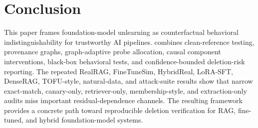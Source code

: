 \section{Conclusion}

This paper frames foundation-model unlearning as counterfactual behavioral indistinguishability for trustworthy AI pipelines. \method{} combines clean-reference testing, provenance graphs, graph-adaptive probe allocation, causal component interventions, black-box behavioral tests, and confidence-bounded deletion-risk reporting. The repeated RealRAG, FineTuneSim, HybridReal, LoRA-SFT, DenseRAG, TOFU-style, natural-data, and attack-suite results show that narrow exact-match, canary-only, retriever-only, membership-style, and extraction-only audits miss important residual-dependence channels. The resulting framework provides a concrete path toward reproducible deletion verification for RAG, fine-tuned, and hybrid foundation-model systems.

